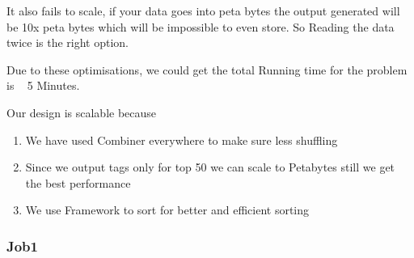 	 	It also fails to scale, if your data goes into peta bytes the output generated will be 10x peta bytes which will be impossible to even store. So Reading the data twice is the right option.

	Due to these optimisations, we could get the total Running time for the problem is ~ 5 Minutes.
	
	Our design is scalable because
	\begin{enumerate}
	\item We have used Combiner everywhere to make sure less shuffling 
	\item Since we output tags only for top 50 we can scale to Petabytes still we get the best performance
	\item We use Framework to sort for better and efficient sorting	
	\end{enumerate}

\subsubsection{Job1}

